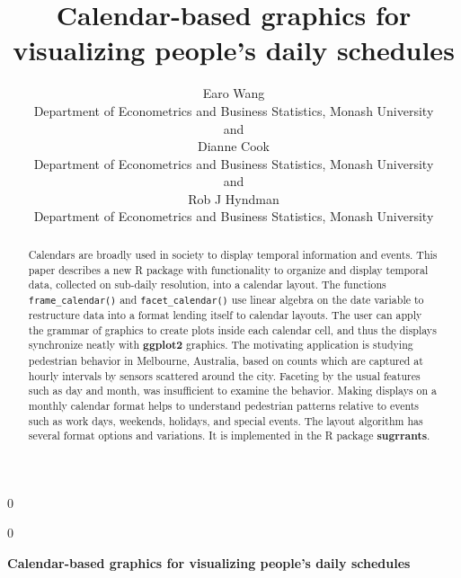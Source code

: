 \documentclass[12pt]{article}
\newcommand{\blind}{0}
\begin{document}
\def\spacingset#1{\renewcommand{\baselinestretch}%
{#1}\small\normalsize} \spacingset{1}



\blind
{
  \title{\bf Calendar-based graphics for visualizing people's daily schedules}

  \author{
        Earo Wang \\
    Department of Econometrics and Business Statistics, Monash University\\
     and \\     Dianne Cook \\
    Department of Econometrics and Business Statistics, Monash University\\
     and \\     Rob J Hyndman \\
    Department of Econometrics and Business Statistics, Monash University\\
      }
  \maketitle
} \fi

\blind
{
  \bigskip
  \bigskip
  \bigskip
  \begin{center}
    {\LARGE\bf Calendar-based graphics for visualizing people's daily schedules}
  \end{center}
  \medskip
} \fi

\bigskip
\begin{abstract}
Calendars are broadly used in society to display temporal information and events. This paper describes a new R package with functionality to organize and display temporal data, collected on sub-daily resolution, into a calendar layout. The functions \texttt{frame\_calendar()} and \texttt{facet\_calendar()} use linear algebra on the date variable to restructure data into a format lending itself to calendar layouts. The user can apply the grammar of graphics to create plots inside each calendar cell, and thus the displays synchronize neatly with \textbf{ggplot2} graphics. The motivating application is studying pedestrian behavior in Melbourne, Australia, based on counts which are captured at hourly intervals by sensors scattered around the city. Faceting by the usual features such as day and month, was insufficient to examine the behavior. Making displays on a monthly calendar format helps to understand pedestrian patterns relative to events such as work days, weekends, holidays, and special events. The layout algorithm has several format options and variations. It is implemented in the R package \textbf{sugrrants}.
\end{abstract}
\end{document}
